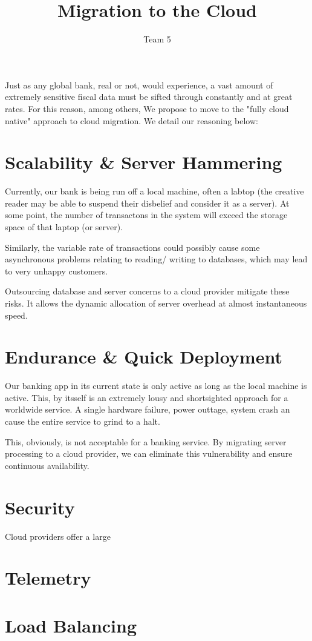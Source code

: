 \documentclass{article}
\title{Migration to the Cloud}
\author{Team 5}
\begin{document}
\maketitle
\par Just as any global bank, real or not, would experience, a vast amount of extremely sensitive fiscal data must be sifted through constantly and at great rates. For this reason, among others, We propose to move to the "fully cloud native" approach to cloud migration. We detail our reasoning below:

\section{Scalability \& Server Hammering}
\par Currently, our bank is being run off a local machine, often a labtop (the creative reader may be able to suspend their disbelief and consider it as a server). At some point, the number of transactons in the system will exceed the storage space of that laptop (or server).

\par Similarly, the variable rate of transactions could possibly cause some asynchronous problems relating to reading/ writing to databases, which may lead to very unhappy customers.

\par Outsourcing database and server concerns to a cloud provider mitigate these risks. It allows the dynamic allocation of server overhead at almost instantaneous speed.

\section{Endurance \& Quick Deployment}
\par Our banking app in its current state is only active as long as the local machine is active. This, by itsself is an extremely lousy and shortsighted approach for a worldwide service. A single hardware failure, power outtage, system crash an cause the entire service to grind to a halt. 
\par This, obviously, is not acceptable for a banking service. By migrating server processing to a cloud provider, we can eliminate this vulnerability and ensure continuous availability.


\section{Security}
\par Cloud providers offer a large 

\section{Telemetry}

\section{Load Balancing}
\end{document}
